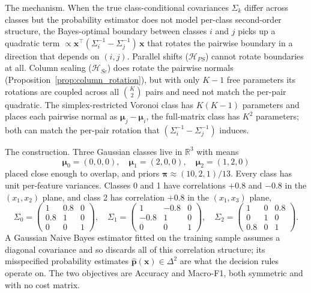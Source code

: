 The mechanism. When the true class-conditional covariances $\Sigma_k$ differ across classes but the probability estimator does not model per-class second-order structure, the Bayes-optimal boundary between classes $i$ and $j$ picks up a quadratic term $\propto \mathbf{x}^\top (\Sigma_i^{-1} - \Sigma_j^{-1})\, \mathbf{x}$ that rotates the pairwise boundary in a direction that depends on $(i, j)$. Parallel shifts ($\mathcal{H}_{PS}$) cannot rotate boundaries at all. Column scaling ($\mathcal{H}_{Sc}$) does rotate the pairwise normals (Proposition~\ref{prop:column_rotation}), but with only $K-1$ free parameters its rotations are coupled across all $\binom{K}{2}$ pairs and need not match the per-pair quadratic. The simplex-restricted Voronoi class has $K(K-1)$ parameters and places each pairwise normal as $\boldsymbol{\mu}_j - \boldsymbol{\mu}_i$, the full-matrix class has $K^2$ parameters; both can match the per-pair rotation that $(\Sigma_i^{-1} - \Sigma_j^{-1})$ induces.

The construction. Three Gaussian classes live in $\mathbb{R}^3$ with means
\begin{equation*}
    \boldsymbol{\mu}_0 = (0, 0, 0), \quad \boldsymbol{\mu}_1 = (2, 0, 0), \quad \boldsymbol{\mu}_2 = (1, 2, 0)
\end{equation*}
placed close enough to overlap, and priors $\boldsymbol{\pi} \approx (10, 2, 1)/13$. Every class has unit per-feature variances. Classes 0 and 1 have correlations $+0.8$ and $-0.8$ in the $(x_1, x_2)$ plane, and class 2 has correlation $+0.8$ in the $(x_1, x_3)$ plane,
\begin{equation*}
    \Sigma_0 = \begin{pmatrix} 1 & 0.8 & 0 \\ 0.8 & 1 & 0 \\ 0 & 0 & 1 \end{pmatrix}, \quad
    \Sigma_1 = \begin{pmatrix} 1 & -0.8 & 0 \\ -0.8 & 1 & 0 \\ 0 & 0 & 1 \end{pmatrix}, \quad
    \Sigma_2 = \begin{pmatrix} 1 & 0 & 0.8 \\ 0 & 1 & 0 \\ 0.8 & 0 & 1 \end{pmatrix}.
\end{equation*}
A Gaussian Naive Bayes estimator fitted on the training sample assumes a diagonal covariance and so discards all of this correlation structure; its misspecified probability estimates $\hat{\mathbf{p}}(\mathbf{x}) \in \Delta^{2}$ are what the decision rules operate on. The two objectives are Accuracy and Macro-F1, both symmetric and with no cost matrix.

